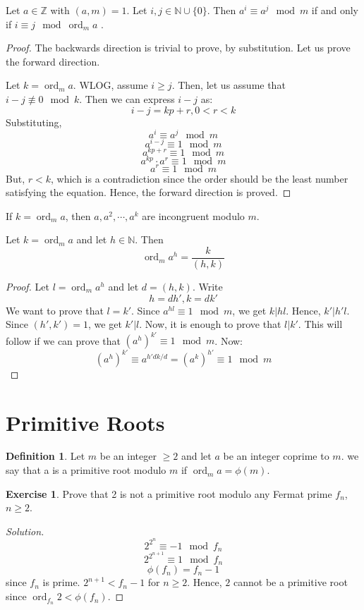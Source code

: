 \documentclass[12pt,letterpaper]{book}
\theoremstyle{definition}
\newtheorem{definition}{Definition} %
\newtheorem*{exercise}{Exercise}
\newenvironment{solution}
  {\renewcommand\qedsymbol{$\blacksquare$}\begin{proof}[Solution]}
  {\end{proof}}
\newcommand{\N}{\mathbb{N}}
\newcommand{\Z}{\mathbb{Z}}
\DeclareMathOperator{\ord}{ord}
\begin{document}
\begin{lemma}
  Let $a \in \Z$ with $(a,m) = 1$. Let $i,j \in \N \cup \{0\}$. Then $a^i \equiv a^j \mod m$ if and only if $i \equiv j \mod \ord_m a$  .
\end{lemma}
\begin{proof}
  The backwards direction is trivial to prove, by substitution. Let us prove the forward direction.
  
  Let $k = \ord_m a$. WLOG, assume $i \geq j$. Then, let us assume that $i-j \not \equiv 0 \mod k$. Then we can express $i-j$ as:
  \[i-j = kp + r, 0 < r < k \]
  Substituting,
  \[a^{i} \equiv a^j \mod m\]
  \[a^{i-j} \equiv 1 \mod m\]
  \[a^{kp+r} \equiv 1 \mod m\]
  \[a^{kp} \cdot a^r \equiv 1 \mod m\]
  \[a^r \equiv 1 \mod m\]
  But, $r < k$, which is a contradiction since the order should be the least number satisfying the equation. Hence, the forward direction is proved.
\end{proof}

\begin{corollary}
If $k = \ord_m a$, then $a,a^2, \cdots , a^k$ are incongruent modulo $m$.
\end{corollary}

\begin{lemma}
  Let $k = \ord_m a$ and let $h \in \N$. Then
  \[\ord_m a^h = \frac{k}{(h,k)}\]
\end{lemma}
\begin{proof}
  Let $l = \ord_m a^h$ and let $d = (h,k)$. Write
  \[h = dh', k = dk'\]
  We want to prove that $l = k'$. Since $a^{hl} \equiv 1 \mod m$, we get $k|hl$. Hence, $k' | h'l$. Since $(h',k') = 1$, we get $k'|l$. Now, it is enough to prove that $l|k'$. This will follow if we can prove that $(a^h)^{k'} \equiv 1 \mod m$. Now:
  \[(a^h)^{k'} \equiv a^{h'dk/d} = (a^k)^{h'} \equiv 1 \mod m\]
\end{proof}

\section{Primitive Roots}

\begin{definition}
  Let $m$ be an integer $\geq 2$ and let $a$ be an integer coprime to $m$. we say that a is a primitive root modulo $m$ if $\ord_m a = \phi(m)$.
\end{definition}

\begin{exercise}
  Prove that 2 is not a primitive root modulo any Fermat prime $f_n$, $n \geq 2$.
\end{exercise}
\begin{solution}
  \[2^{2^n} \equiv -1 \mod f_n\] 
  \[2^{2^{n+1}} \equiv 1 \mod f_n\]
  \[\phi(f_n) = f_n-1\]
  since $f_n$ is prime. $2^{n+1} < f_n-1$ for $n \geq 2$. Hence, $2$ cannot be a primitive root since $\ord_{f_n} 2 < \phi(f_n)$.
\end{solution}
\end{document}
